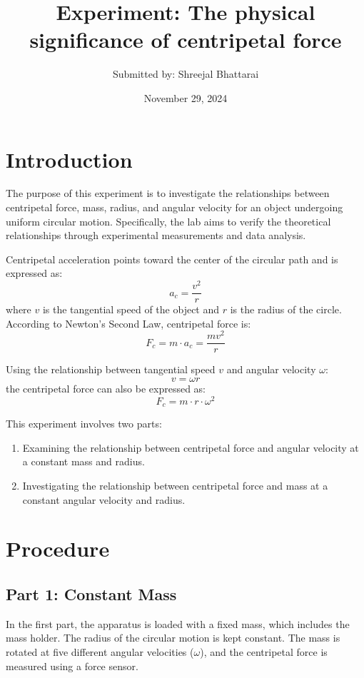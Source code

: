 \documentclass{report}
\title{\Huge Experiment: The physical significance of centripetal force}
\author{\Large Submitted by: Shreejal Bhattarai}
\date{November 29, 2024}
\begin{document}
\maketitle

\section{Introduction}
The purpose of this experiment is to investigate the relationships between centripetal force, mass, radius, and angular velocity for an object undergoing uniform circular motion. Specifically, the lab aims to verify the theoretical relationships through experimental measurements and data analysis. 

Centripetal acceleration points toward the center of the circular path and is expressed as:
\begin{equation}
    a_c = \frac{v^2}{r}
\end{equation}
where \( v \) is the tangential speed of the object and \( r \) is the radius of the circle. According to Newton's Second Law, centripetal force is:
\begin{equation}
    F_c = m \cdot a_c = \frac{m v^2}{r}
\end{equation}

Using the relationship between tangential speed \( v \) and angular velocity \( \omega \):
\begin{equation}
    v = \omega r
\end{equation}
the centripetal force can also be expressed as:
\begin{equation}
    F_c = m \cdot r \cdot \omega^2
\end{equation}

This experiment involves two parts:
\begin{enumerate}
    \item Examining the relationship between centripetal force and angular velocity at a constant mass and radius.
    \item Investigating the relationship between centripetal force and mass at a constant angular velocity and radius.
\end{enumerate}

\section{Procedure}
\subsection{Part 1: Constant Mass}
In the first part, the apparatus is loaded with a fixed mass, which includes the mass holder. The radius of the circular motion is kept constant. The mass is rotated at five different angular velocities (\( \omega \)), and the centripetal force is measured using a force sensor. 
\end{document}
